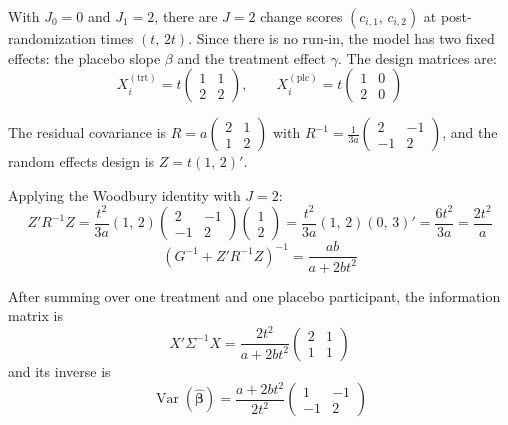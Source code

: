 \documentclass[
  11pt,
]{article}
\begin{document}
With \(J_0=0\) and \(J_1=2\), there are \(J = 2\) change scores
\((c_{i,1},\, c_{i,2})\) at post-randomization times \((t,\,
2t)\). Since there is no run-in, the model has two fixed effects: the
placebo slope \(\beta\) and the treatment effect \(\gamma\). The design
matrices are: \[
  X_i^{(\text{trt})} = t\begin{pmatrix}
    1 & 1 \\ 2 & 2
  \end{pmatrix}, \qquad
  X_i^{(\text{plc})} = t\begin{pmatrix}
    1 & 0 \\ 2 & 0
  \end{pmatrix}
\]

The residual covariance is
\(R = a \begin{pmatrix} 2 & 1 \\ 1 & 2 \end{pmatrix}\) with
\(R^{-1} = \frac{1}{3a}
\begin{pmatrix} 2 & -1 \\ -1 & 2 \end{pmatrix}\), and the random effects
design is \(Z = t(1,\, 2)'\).

Applying the Woodbury identity with \(J = 2\): \begin{equation}
  Z'R^{-1}Z = \frac{t^2}{3a}(1,\,2)
    \begin{pmatrix}2&-1\\-1&2\end{pmatrix}
    \begin{pmatrix}1\\2\end{pmatrix}
  = \frac{t^2}{3a}(1,\,2)(0,\,3)' = \frac{6t^2}{3a}
  = \frac{2t^2}{a}
\end{equation} \begin{equation}
  (G^{-1} + Z'R^{-1}Z)^{-1}
  = \frac{ab}{a + 2bt^2}
\end{equation}

After summing over one treatment and one placebo participant, the
information matrix is \begin{equation}
  X'\Sigma^{-1}X
  = \frac{2t^2}{a + 2bt^2}
    \begin{pmatrix} 2 & 1 \\ 1 & 1 \end{pmatrix}
\end{equation} and its inverse is \begin{equation}
  \mathop{\mathrm{Var}}(\hat{\boldsymbol{\beta}})
  = \frac{a + 2bt^2}{2t^2}
    \begin{pmatrix} 1 & -1 \\ -1 & 2 \end{pmatrix}
  \label{eq:var_frost}
\end{equation}
\end{document}
